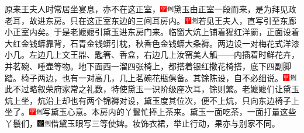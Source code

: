 原来王夫人时常居坐宴息，亦不在这正室，{\includegraphics[width=3mm]{../Images/00002}\includegraphics[width=3mm]{../Images/00011}\footnotesize \kaishu 黛玉由正室一段而来，是为拜见政老耳，故进东房。}只在这正室东边的三间耳房内。{\includegraphics[width=3mm]{../Images/00002}\includegraphics[width=3mm]{../Images/00011}\footnotesize \kaishu 若见王夫人，直写引至东廊小正室内矣。}于是老嬷嬷引黛玉进东房门来。临窗大炕上铺着猩红洋罽，正面设着大红金钱蟒靠背，石青金钱蟒引枕，秋香色金钱蟒大条褥。两边设一对梅花式洋漆小几。左边几上文王鼎、匙箸、香盒，右边几上汝窑美人觚------内插着时鲜花卉，并茗碗、唾壶等物。地下面西一溜四张椅上，都搭着银红撒花椅搭，底下四副脚踏。椅子两边，也有一对高几，几上茗碗花瓶俱备。其馀陈设，自不必细说。{\includegraphics[width=3mm]{../Images/00002}\includegraphics[width=3mm]{../Images/00011}\footnotesize \kaishu 此不过略叙荣府家常之礼数，特使黛玉一识阶级座次耳，馀则繁。}老嬷嬷们让黛玉炕上坐，炕沿上却也有两个锦褥对设，黛玉度其位次，便不上炕，只向东边椅子上坐了。{\includegraphics[width=3mm]{../Images/00002}\includegraphics[width=3mm]{../Images/00011}\footnotesize \kaishu 写黛玉心意。}本房内的丫鬟忙捧上茶来。黛玉一面吃茶，一面打量这些丫鬟们，{\includegraphics[width=3mm]{../Images/00006}\includegraphics[width=3mm]{../Images/00011}\footnotesize \kaishu 借黛玉眼写三等使婢。}妆饰衣裙，举止行动，果亦与别家不同。

